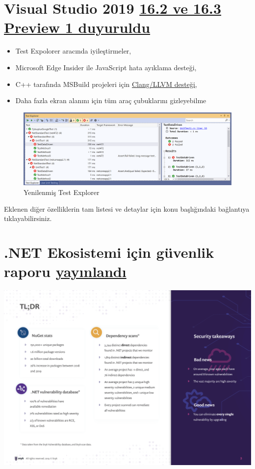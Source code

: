 \documentclass[11pt]{article}
\begin{document}
\section{Visual Studio 2019 \href{https://devblogs.microsoft.com/visualstudio/visual-studio-2019-version-16-2-generally-available-and-16-3-preview-1/}{16.2 ve 16.3 Preview 1 duyuruldu}}
\label{sec:orgcef2e30}
\begin{itemize}
\item Test Expolorer aracında iyileştirmeler,
\item Microsoft Edge Insider ile JavaScript hata ayıklama desteği,
\item C++ tarafında MSBuild projeleri için \href{https://devblogs.microsoft.com/cppblog/clang-llvm-support-for-msbuild-projects/}{Clang/LLVM desteği},
\item Daha fazla ekran alanını için tüm araç çubuklarını gizleyebilme
\end{itemize}

\begin{figure}[htbp]
\centering
\includegraphics[width=.9\linewidth]{gorseller/visualstudio-yeni-test-explorer.png}
\caption{Yenilenmiş Test Explorer}
\end{figure}

Eklenen diğer özelliklerin tam listesi ve detaylar için konu başlığındaki
bağlantıya tıklayabilirsiniz.
\section{.NET Ekosistemi için güvenlik raporu \href{https://snyk.io/blog/net-open-source-security-insights/}{yayınlandı}}
\label{sec:orgc4bf8cf}
\begin{center}
\includegraphics[width=.9\linewidth]{gorseller/dotnet-guvenlik-raporu-tldr.png}
\end{center}
\end{document}
